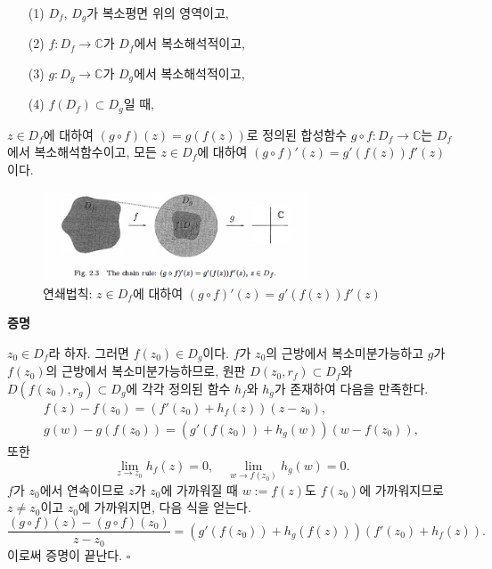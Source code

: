 \begin{salt_prop}[연쇄법칙] \label{prop-2-2} 
\ 
\begin{itemize}
\item[(1)] $D_f$, $D_g$가 복소평면 위의 영역이고,
\item[(2)] $f:D_f \to \mathbb C$가 $D_f$에서 복소해석적이고,
\item[(3)] $g:D_g \to \mathbb C$가 $D_g$에서 복소해석적이고,
\item[(4)] $f(D_f) \subset D_g$일 때,
\end{itemize}
$z\in D_f$에 대하여 $(g\circ f)(z) = g(f(z))$로 정의된
합성함수 $g\circ f : D_f \to \mathbb C$는 $D_f$에서
복소해석함수이고, 
모든 $z\in D_f$에 대하여 $(g\circ f)'(z) = g'(f(z))f'(z)$이다.
\end{salt_prop}

\begin{figure}[!h]
\begin{center}
\includegraphics[width=0.7\textwidth]{./SaltChapter/fig-2-3}
\end{center}
\caption{연쇄법칙: $z\in D_f$에 대하여 $(g\circ f)'(z) = g'(f(z))f'(z)$}
\label{fig-2-3}
\end{figure}

{\bf 증명}

$z_0\in D_f$라 하자. 그러면 $f(z_0)\in D_g$이다.
$f$가 $z_0$의 근방에서 복소미분가능하고
$g$가 $f(z_0)$의 근방에서 복소미분가능하므로,
원판 $D(z_0, r_f)\subset D_f$와 $D(f(z_0), r_g) \subset D_g$에 각각 정의된
함수 $h_f$와 $h_g$가 존재하여 다음을 만족한다.
\begin{gather*}
f(z) - f(z_0) = (f'(z_0)+h_f(z))(z-z_0), \\
g(w) - g(f(z_0)) = (g'(f(z_0)) + h_g(w))(w-f(z_0)),
\end{gather*}
또한
\[
\lim_{z\to z_0} h_f(z)=0, \quad
\lim_{w\to f(z_0)} h_g(w)=0.
\]
$f$가 $z_0$에서 연속이므로
$z$가 $z_0$에 가까워질 때 $w:=f(z)$도 $f(z_0)$에 가까워지므로
$z\ne z_0$이고 $z_0$에 가까워지면, 다음 식을 얻는다.
\[
\dfrac{(g\circ f)(z) - (g\circ f)(z_0)}{z-z_0} 
= (g'(f(z_0)) + h_g(f(z)))(f'(z_0) + h_f(z)).
\]
이로써 증명이 끝난다. \hfill $\square$

